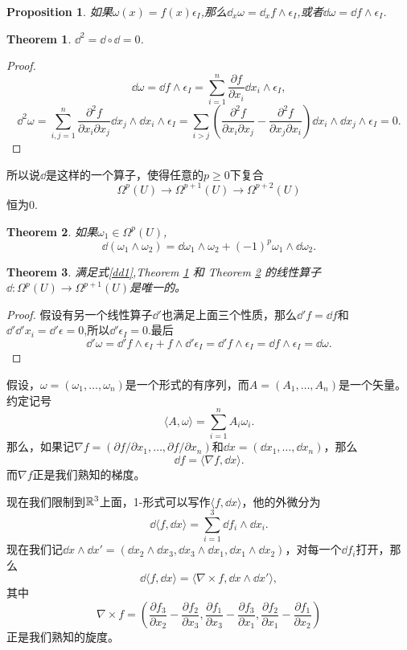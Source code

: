 \documentclass[8pt]{book}
\theoremstyle{plain}%
\newtheorem{pro}{Proposition}[section]%
\newtheorem{theo}{Theorem}[section]%
\begin{document}
\begin{pro}
如果$\omega(x)=f(x)\epsilon_I$,那么$\dd_x \omega=\dd_x f\wedge \epsilon_I$,或者$\dd \omega=\dd f\wedge \epsilon_I$.
\end{pro}
\begin{theo}
\label{dd2}
$\dd^2=\dd \circ \dd=0$.
\end{theo}
\begin{proof}
\[
\dd \omega =\dd f\wedge \epsilon_I=\sum_{i=1}^n\frac{\partial f}{\partial x_i}\dd x_i\wedge \epsilon_I,
\]
\[
\dd^2 \omega=\sum_{i,j=1}^n\frac{\partial^2 f}{\partial x_i\partial x_j}\dd x_j \wedge \dd x_i\wedge \epsilon_I=\sum_{i>j}\left(\frac{\partial^2 f}{\partial x_i\partial x_j}-\frac{\partial^2 f}{\partial x_j\partial x_i}\right)\dd x_i \wedge \dd x_j\wedge \epsilon_I=0.
\]
\end{proof}
所以说$\dd$是这样的一个算子，使得任意的$p\geq 0$下复合
\[
\Omega^p(U)\to\Omega^{p+1}(U)\to\Omega^{p+2}(U)
\]
恒为0.
\begin{theo}\label{dd3}
如果$\omega_1\in\Omega^p(U)$,
\[
\dd\left(\omega_1\wedge \omega_2\right)=\dd\omega_1\wedge \omega_2+(-1)^p\omega_1\wedge \dd\omega_2.
\]
\end{theo}
\begin{theo}满足式\eqref{dd1},{\rm Theorem \ref{dd2}} 和 {\rm Theorem \ref{dd3}} 的线性算子$\dd:\Omega^p(U)\to\Omega^{p+1}(U)$是唯一的。
\end{theo}
\begin{proof}
假设有另一个线性算子$\dd'$也满足上面三个性质，那么$\dd'f=\dd f$和$\dd' \dd' x_i=\dd'\epsilon=0$,所以$\dd' \epsilon_I=0$.最后
\[
\dd' \omega= \dd' f\wedge \epsilon_I+f\wedge \dd'\epsilon_I= \dd' f\wedge \epsilon_I= \dd f\wedge \epsilon_I=\dd \omega.
\]
\end{proof}
假设，$\omega=(\omega_1,\dots,\omega_n)$是一个形式的有序列，而$A=(A_1,\dots,A_n)$是一个矢量。约定记号
\[
\langle A, \omega \rangle=\sum_{i=1}^n A_i \omega_i.
\]
那么，如果记$\nabla f=(\partial f/\partial x_1,\dots,\partial f/\partial x_n)$和$\dd x =(\dd x_1,\dots,\dd x_n)$，那么
\[
\dd f = \langle \nabla f, \dd x \rangle.
\]
而$\nabla f$正是我们熟知的梯度。

现在我们限制到$\mathbb{R}^3$上面，1-形式可以写作$\langle f, \dd x \rangle$，他的外微分为
\[
\dd\langle f, \dd x \rangle=\sum_{i=1}^3\dd f_i\wedge \dd x_i.
\]
现在我们记$\dd x \wedge \dd x' =(\dd x_2 \wedge \dd x_3,\dd x_3 \wedge \dd x_1,\dd x_1 \wedge \dd x_2)$，对每一个$\dd f_i$打开，那么
\[
\dd\langle f, \dd x \rangle=\langle \nabla\times f, \dd x \wedge \dd x'  \rangle,
\]
其中
\[
\nabla\times f=\left(\frac{\partial f_3}{\partial x_2}-\frac{\partial f_2}{\partial x_3},\frac{\partial f_1}{\partial x_3}-\frac{\partial f_3}{\partial x_1},\frac{\partial f_2}{\partial x_1}-\frac{\partial f_1}{\partial x_2}\right)
\]
正是我们熟知的旋度。
\end{document}
